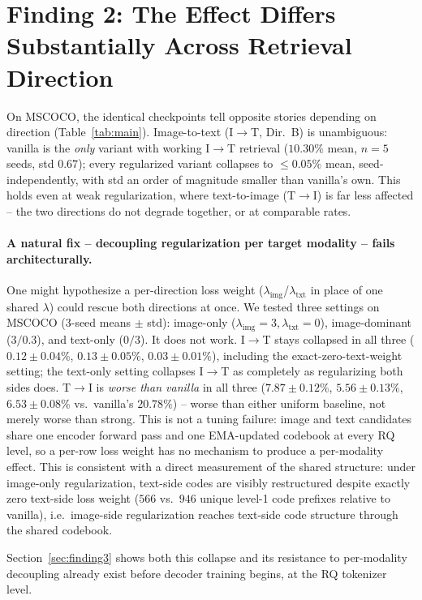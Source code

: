 \section{Finding 2: The Effect Differs Substantially Across Retrieval Direction}
\label{sec:finding2}

On MSCOCO, the identical checkpoints tell opposite stories depending on direction (Table~\ref{tab:main}). Image-to-text (I$\to$T, Dir.\ B) is unambiguous: vanilla is the \emph{only} variant with working I$\to$T retrieval ($10.30\%$ mean, $n{=}5$ seeds, std $0.67$); every regularized variant collapses to $\leq0.05\%$ mean, seed-independently, with std an order of magnitude smaller than vanilla's own. This holds even at weak regularization, where text-to-image (T$\to$I) is far less affected -- the two directions do not degrade together, or at comparable rates.

\paragraph{A natural fix -- decoupling regularization per target modality -- fails architecturally.} One might hypothesize a per-direction loss weight ($\lambda_{\text{img}}$/$\lambda_{\text{txt}}$ in place of one shared $\lambda$) could rescue both directions at once. We tested three settings on MSCOCO (3-seed means $\pm$ std): image-only ($\lambda_{\text{img}}{=}3,\lambda_{\text{txt}}{=}0$), image-dominant ($3/0.3$), and text-only ($0/3$). It does not work. I$\to$T stays collapsed in all three ($0.12\pm0.04\%$, $0.13\pm0.05\%$, $0.03\pm0.01\%$), including the exact-zero-text-weight setting; the text-only setting collapses I$\to$T as completely as regularizing both sides does. T$\to$I is \emph{worse than vanilla} in all three ($7.87\pm0.12\%$, $5.56\pm0.13\%$, $6.53\pm0.08\%$ vs.\ vanilla's $20.78\%$) -- worse than either uniform baseline, not merely worse than strong. This is not a tuning failure: image and text candidates share one encoder forward pass and one EMA-updated codebook at every RQ level, so a per-row loss weight has no mechanism to produce a per-modality effect. This is consistent with a direct measurement of the shared structure: under image-only regularization, text-side codes are visibly restructured despite exactly zero text-side loss weight ($566$ vs.\ $946$ unique level-1 code prefixes relative to vanilla), i.e.\ image-side regularization reaches text-side code structure through the shared codebook.

Section~\ref{sec:finding3} shows both this collapse and its resistance to per-modality decoupling already exist before decoder training begins, at the RQ tokenizer level.
